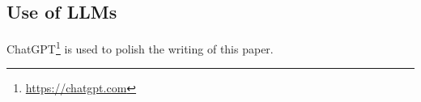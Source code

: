

%
%



\subsection{Use of LLMs}

ChatGPT\footnote{\url{https://chatgpt.com}} is used to polish the writing of this paper.
